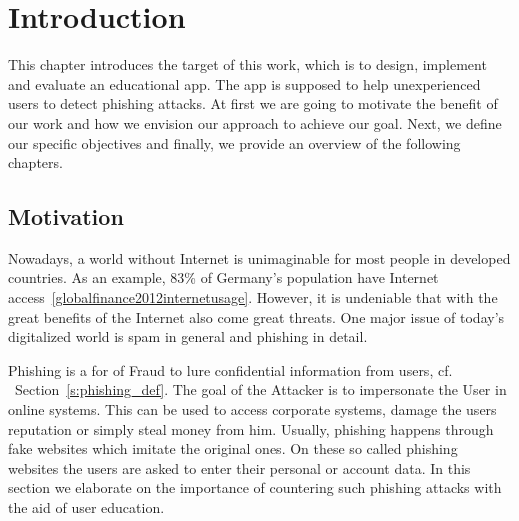 \section{Introduction}
\label{s:introduction}
This chapter introduces the target of this work, which is to design, implement and evaluate an educational app.
 The app is supposed to help unexperienced users to detect phishing attacks.
 At first we are going to motivate the benefit of our work and how we envision our approach to achieve our goal.
 Next, we define our specific objectives and finally, we provide an overview of the following chapters.


\subsection{Motivation}
Nowadays, a world without Internet is unimaginable for most people in developed countries.
As an example, 83\% of Germany's population have Internet access~\ref{globalfinance2012internetusage}. 
However, it is undeniable that with the great benefits of the Internet also come great threats. 
One major issue of today's digitalized world is spam in general and phishing in detail. 

Phishing is a for of Fraud to lure confidential information from users, cf.
~Section~\ref{s:phishing_def}. The goal of the Attacker is to impersonate the User in online systems.
 This can be used to access corporate systems, damage the users reputation or simply steal money from him.
 Usually, phishing happens through fake websites which imitate the original ones.
 On these so called phishing websites the users are asked to enter their personal or account data.
 In this section we elaborate on the importance of countering such phishing attacks with the aid of user education. 



